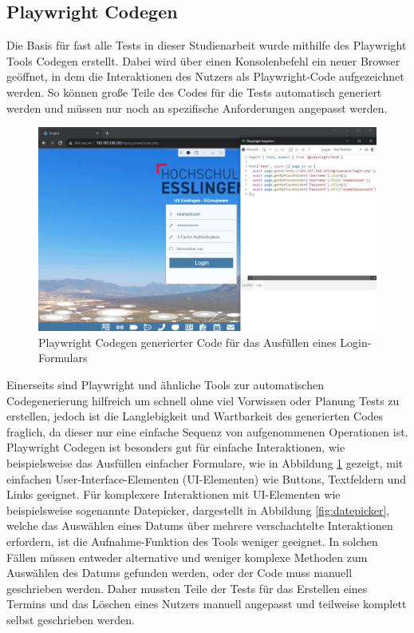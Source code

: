 \subsection*{Playwright Codegen}

Die Basis für fast alle Tests in dieser Studienarbeit wurde mithilfe des Playwright Tools Codegen erstellt.
Dabei wird über einen Konsolenbefehl ein neuer Browser geöffnet, in dem die Interaktionen des Nutzers als Playwright-Code aufgezeichnet werden.
So können große Teile des Codes für die Tests automatisch generiert werden und müssen nur noch an spezifische Anforderungen angepasst werden.
\begin{figure}[H]
    \centering
    \includegraphics[width=1\textwidth]{images/Playwright_Codegen.png}
    \caption{Playwright Codegen generierter Code für das Ausfüllen eines Login-Formulars}
    \label{fig:playwright-codegen}
\end{figure}

Einerseits sind Playwright und ähnliche Tools zur automatischen Codegenerierung hilfreich um schnell ohne viel Vorwissen oder Planung Tests zu erstellen, jedoch ist die Langlebigkeit und Wartbarkeit des generierten Codes fraglich, da dieser nur eine \glqq einfache Sequenz von aufgenommenen Operationen\grqq \autocite[][294]{automating-e2e-manual} ist.
Playwright Codegen ist besonders gut für einfache Interaktionen, wie beispielsweise das Ausfüllen einfacher Formulare, wie in Abbildung \ref{fig:playwright-codegen} gezeigt, mit einfachen User-Interface-Elementen (UI-Elementen) wie Buttons, Textfeldern und Links geeignet.
Für komplexere Interaktionen mit UI-Elementen wie beispielsweise sogenannte Datepicker, dargestellt in Abbildung \ref{fig:datepicker}, welche das Auswählen eines Datums über mehrere verschachtelte Interaktionen erfordern, ist die Aufnahme-Funktion des Tools weniger geeignet.
In solchen Fällen müssen entweder alternative und weniger komplexe Methoden zum Auswählen des Datums gefunden werden, oder der Code muss manuell geschrieben werden.
Daher mussten Teile der Tests für das Erstellen eines Termins und das Löschen eines Nutzers manuell angepasst und teilweise komplett selbst geschrieben werden.

